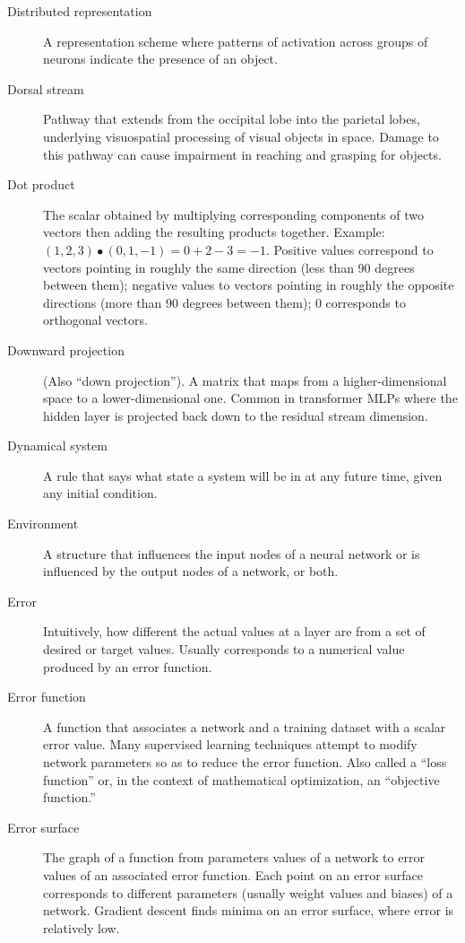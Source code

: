 \begin{description}
\item[Distributed representation] A representation scheme where patterns of activation across groups of neurons indicate the presence of an object. 

\item[Dorsal stream] Pathway that extends from the occipital lobe into the parietal lobes, underlying visuospatial processing of visual objects in space. Damage to this pathway can cause impairment in reaching and grasping for objects. 

\item[Dot product] The scalar obtained by multiplying corresponding components of two vectors then adding the resulting products together. Example: $(1,2,3) \bullet (0,1,-1) = 0+2-3 = -1$.  Positive values correspond to vectors pointing in roughly the same direction (less than 90 degrees between them); negative values to vectors pointing in roughly the opposite directions (more than 90 degrees between them); 0 corresponds to orthogonal vectors. 

\item[Downward projection] (Also ``down projection''). A matrix that maps from a higher-dimensional space to a lower-dimensional one. Common in transformer MLPs where the hidden layer is projected back down to the residual stream dimension.

\item[Dynamical system] A rule that says what state a system will be in at any future time, given any initial condition.

\item[Environment] A structure that influences the input nodes of a neural network or is influenced by the output nodes of a network, or both.

\item[Error] Intuitively, how different the actual values at a layer are from a set of desired or target values. Usually corresponds to a numerical value produced by an error function.

\item[Error function] A function that associates a network and a training dataset with a scalar error value. Many supervised learning techniques attempt to modify network parameters so as to reduce the error function. Also called a ``loss function'' or, in the context of mathematical optimization, an ``objective function.''

\item[Error surface] The graph of a function from parameters values of a network to error values of an associated error function. Each point on an error surface corresponds to different parameters (usually weight values and biases) of a network. Gradient descent finds minima on an error surface, where error is relatively low.


\end{description}
